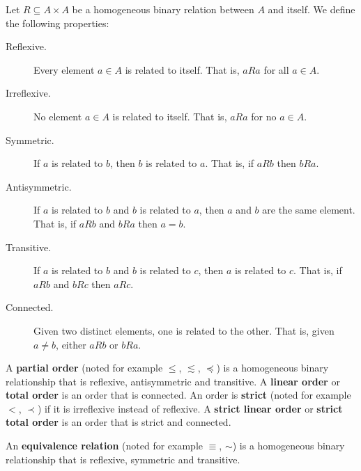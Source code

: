 \documentclass{bareminimum}
\begin{document}
\begin{defn}
	Let $R \subseteq A \times A$  be a homogeneous binary relation between $A$ and itself. We define the following properties:
	\begin{description}
		\item[Reflexive.] Every element $a \in A$ is related to itself. That is, $aRa$ for all $a \in A$.
		\item[Irreflexive.] No element $a \in A$ is related to itself. That is, $aRa$ for no $a \in A$.
		\item[Symmetric.] If $a$ is related to $b$, then $b$ is related to $a$. That is, if $aRb$ then $bRa$.
		\item[Antisymmetric.] If $a$ is related to $b$ and $b$ is related to $a$, then $a$ and $b$ are the same element. That is, if $aRb$ and $bRa$ then $a=b$.
		\item[Transitive.] If $a$ is related to $b$ and $b$ is related to $c$, then $a$ is related to $c$. That is, if $aRb$ and $bRc$ then $aRc$.
		\item[Connected.] Given two distinct elements, one is related to the other. That is, given $a \neq b$, either $aRb$ or $bRa$.
	\end{description}
	
\end{defn}

\begin{defn}
	A \textbf{partial order}  (noted for example $\leq$, $\lesssim$, $\preceq$)  is a homogeneous binary relationship that is reflexive, antisymmetric and transitive. A \textbf{linear order} or \textbf{total order} is an order that is connected. An order is \textbf{strict} (noted for example $<$, $\prec$) if it is irreflexive instead of reflexive. A \textbf{strict linear order} or \textbf{strict total order} is an order that is strict and connected.
	
	An \textbf{equivalence relation} (noted for example $\equiv$, $\sim$) is a homogeneous binary relationship that is reflexive, symmetric and transitive.
\end{defn}
\end{document}
